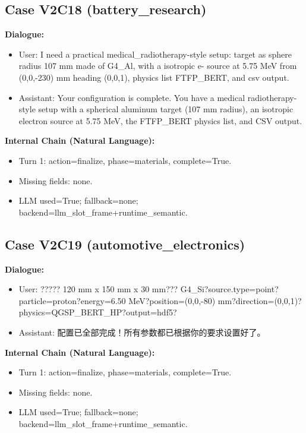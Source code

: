 \documentclass[11pt]{ctexart}
\begin{document}
\subsection{Case V2C18 (battery\_research)}
\textbf{Dialogue:}
\begin{itemize}
\item User: I need a practical medical\_radiotherapy-style setup: target as sphere radius 107 mm made of G4\_Al, with a isotropic e- source at 5.75 MeV from (0,0,-230) mm heading (0,0,1), physics list FTFP\_BERT, and csv output.
\item Assistant: Your configuration is complete. You have a medical radiotherapy-style setup with a spherical aluminum target (107 mm radius), an isotropic electron source at 5.75 MeV, the FTFP\_BERT physics list, and CSV output.
\end{itemize}
\textbf{Internal Chain (Natural Language):}
\begin{itemize}
\item Turn 1: action=finalize, phase=materials, complete=True.
\item Missing fields: none.
\item LLM used=True; fallback=none; backend=llm\_slot\_frame+runtime\_semantic.
\end{itemize}
\subsection{Case V2C19 (automotive\_electronics)}
\textbf{Dialogue:}
\begin{itemize}
\item User: ????? 120 mm x 150 mm x 30 mm??? G4\_Si?source.type=point?particle=proton?energy=6.50 MeV?position=(0,0,-80) mm?direction=(0,0,1)?physics=QGSP\_BERT\_HP?output=hdf5?
\item Assistant: 配置已全部完成！所有参数都已根据你的要求设置好了。
\end{itemize}
\textbf{Internal Chain (Natural Language):}
\begin{itemize}
\item Turn 1: action=finalize, phase=materials, complete=True.
\item Missing fields: none.
\item LLM used=True; fallback=none; backend=llm\_slot\_frame+runtime\_semantic.
\end{itemize}
\end{document}
